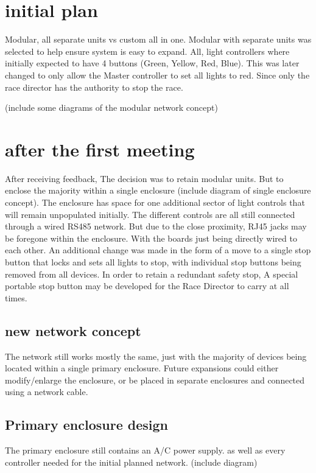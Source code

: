 \documentclass{article}
\begin{document}
     \section{initial plan}
     Modular, all separate units vs custom all in one. 
     Modular with separate units was selected to help ensure system is easy to expand.
     All, light controllers where initially expected to have 4 buttons (Green, Yellow, Red, Blue).
     This was later changed to only allow the Master controller to set all lights to red. 
     Since only the race director has the authority to stop the race.
     
     (include some diagrams of the modular network concept)
     
     \section{after the first meeting}
     After receiving feedback, The decision was to retain modular units. 
     But to enclose the majority within a single enclosure (include diagram of single enclosure concept). 
     The enclosure has space for one additional sector of light controls that will remain unpopulated initially. 
     The different controls are all still connected through a wired RS485 network. 
     But due to the close proximity, RJ45 jacks may be foregone within the enclosure. 
     With the boards just being directly wired to each other.
     An additional change was made in the form of a move to a single stop button that locks and sets all lights to stop, with individual stop buttons being removed from all devices.
     In order to retain a redundant safety stop, A special portable stop button may be developed for the Race Director to carry at all times.
     
     \subsection{new network concept}
     The network still works mostly the same, just with the majority of devices being  located within a single primary enclosure.
     Future expansions could either modify/enlarge the enclosure,
     or be placed in separate enclosures and connected using a network cable.
     
     \subsection{Primary enclosure design}
     The primary enclosure still contains an A/C power supply. as well as every controller needed for the initial planned network.
     (include diagram)
\end{document}
